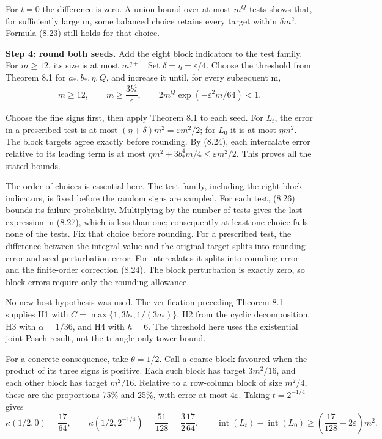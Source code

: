 \documentclass[english,11pt,a4paper]{article}
\newcounter{none}
\begin{document}
For \(t=0\) the difference is zero. A union bound over at most \(m^Q\) tests shows that, for sufficiently large m, some balanced choice retains every target within \(\delta m^2\). Formula (8.23) still holds for that choice.

\textbf{Step 4: round both seeds.} Add the eight block indicators to the test family. For \(m\geq12\), its size is at most \(m^{q+1}\). Set \(\delta=\eta=\varepsilon/4\). Choose the threshold from Theorem 8.1 for \(a_*,b_*,\eta,Q\), and increase it until, for every subsequent m,
\[m\geq12,\qquad m\geq\frac{3b_*^4}{\varepsilon},\qquad
2m^Q\exp(-\varepsilon^2m/64)<1.                              \tag{8.27}\]

Choose the fine signs first, then apply Theorem 8.1 to each seed. For \(L_t\), the error in a prescribed test is at most \((\eta+\delta)m^2=\varepsilon m^2/2\); for \(L_0\) it is at most \(\eta m^2\). The block targets agree exactly before rounding. By (8.24), each intercalate error relative to its leading term is at most \(\eta m^2+3b_*^4m/4\leq\varepsilon m^2/2\). This proves all the stated bounds.

The order of choices is essential here. The test family, including the eight block indicators, is fixed before the random signs are sampled. For each test, (8.26) bounds its failure probability. Multiplying by the number of tests gives the last expression in (8.27), which is less than one; consequently at least one choice fails none of the tests. Fix that choice before rounding. For a prescribed test, the difference between the integral value and the original target splits into rounding error and seed perturbation error. For intercalates it splits into rounding error and the finite-order correction (8.24). The block perturbation is exactly zero, so block errors require only the rounding allowance.

No new host hypothesis was used. The verification preceding Theorem 8.1 supplies H1 with \(C=\max\{1,3b_*,1/(3a_*)\}\), H2 from the cyclic decomposition, H3 with \(\alpha=1/36\), and H4 with \(h=6\). The threshold here uses the existential joint Pasch result, not the triangle-only tower bound.

For a concrete consequence, take \(\theta=1/2\). Call a coarse block favoured when the product of its three signs is positive. Each such block has target \(3m^2/16\), and each other block has target \(m^2/16\). Relative to a row-column block of size \(m^2/4\), these are the proportions 75\% and 25\%, with error at most \(4\varepsilon\). Taking \(t=2^{-1/4}\) gives
\[\kappa(1/2,0)=\frac{17}{64},\qquad
\kappa(1/2,2^{-1/4})=\frac{51}{128}=\frac32\frac{17}{64},
\qquad
\operatorname{int}(L_t)-\operatorname{int}(L_0)
\geq\left(\frac{17}{128}-2\varepsilon\right)m^2.              \tag{8.28}\]
\end{document}
